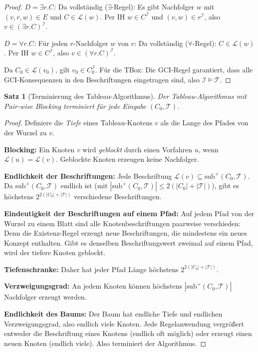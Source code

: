 ﻿\documentclass[a4paper,12pt]{article}
\theoremstyle{definition}
\theoremstyle{plain}
\newtheorem{satz}{Satz}[section]
\theoremstyle{remark}
\newcommand{\Tbox}{\ensuremath{\mathcal{T}}}
\newcommand{\interp}[1]{\ensuremath{\mathcal{#1}}}
\begin{document}
\begin{proof}
\textit{$D = \exists r.C$:}
Da vollst{\"{a}}ndig ($\exists$-Regel): Es gibt Nachfolger $w$
mit $(v,r,w) \in E$ und $C \in \mathcal{L}(w)$.
Per IH $w \in C^\interp{I}$ und $(v,w) \in r^\interp{I}$,
also $v \in (\exists r.C)^\interp{I}$. \checkmark

\textit{$D = \forall r.C$:}
F{\"{u}}r jeden $r$-Nachfolger $w$ von $v$:
Da vollst{\"{a}}ndig ($\forall$-Regel): $C \in \mathcal{L}(w)$.
Per IH $w \in C^\interp{I}$, also $v \in (\forall r.C)^\interp{I}$. \checkmark

Da $C_0 \in \mathcal{L}(v_0)$, gilt $v_0 \in C_0^\interp{I}$.
F{\"{u}}r die TBox: Die GCI-Regel garantiert, dass alle GCI-Konsequenzen
in den Beschriftungen eingetragen sind, also $\interp{I} \models \Tbox$.
\qedhere
\end{proof}

\begin{satz}[Terminierung des Tableau-Algorithmus]
\label{satz:terminierung}
Der Tableau-Algorithmus mit Pair-wise Blocking terminiert
f{\"{u}}r jede Eingabe $(C_0, \Tbox)$.
\end{satz}

\begin{proof}
Definiere die \emph{Tiefe} eines Tableau-Knotens $v$ als die
Lange des Pfades von der Wurzel zu $v$.

\textbf{Blocking:} Ein Knoten $v$ wird \emph{geblockt} durch
einen Vorfahren $u$, wenn $\mathcal{L}(u) = \mathcal{L}(v)$.
Geblockte Knoten erzeugen keine Nachfolger.

\textbf{Endlichkeit der Beschriftungen:}
Jede Beschriftung $\mathcal{L}(v) \subseteq \mathrm{sub}^+(C_0, \Tbox)$.
Da $\mathrm{sub}^+(C_0, \Tbox)$ endlich ist (mit
$|\mathrm{sub}^+(C_0, \Tbox)| \leq 2(|C_0| + |\Tbox|)$),
gibt es h{\"{o}}chstens $2^{2(|C_0|+|\Tbox|)}$ verschiedene Beschriftungen.

\textbf{Eindeutigkeit der Beschriftungen auf einem Pfad:}
Auf jedem Pfad von der Wurzel zu einem Blatt sind alle
Knotenbeschriftungen paarweise verschieden:
Denn die Existenz-Regel erzeugt neue Beschriftungen, die mindestens
ein neues Konzept enthalten. Gibt es denselben Beschriftungswert
zweimal auf einem Pfad, wird der tiefere Knoten geblockt.

\textbf{Tiefenschranke:} Daher hat jeder Pfad L{\"{a}}nge h{\"{o}}chstens
$2^{2(|C_0|+|\Tbox|)}$.

\textbf{Verzweigungsgrad:} An jedem Knoten k{\"{o}}nnen h{\"{o}}chstens
$|\mathrm{sub}^+(C_0,\Tbox)|$ Nachfolger erzeugt werden.

\textbf{Endlichkeit des Baums:} Der Baum hat endliche Tiefe
und endlichen Verzweigungsgrad, also endlich viele Knoten.
Jede Regelanwendung vergr{\"{o}}{\ss}ert entweder die Beschriftung
eines Knotens (endlich oft m{\"{o}}glich) oder erzeugt einen neuen Knoten
(endlich viele). Also terminiert der Algorithmus.
\qedhere
\end{proof}
\end{document}
